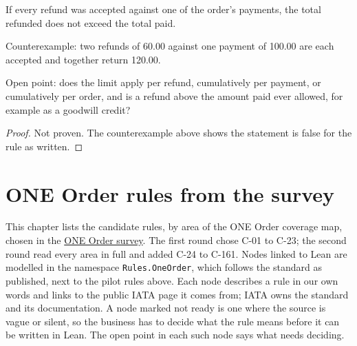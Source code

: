 \begin{theorem}
  \label{thm:refunds-le-payments}
  If every refund was accepted against one of the order's payments, the total
  refunded does not exceed the total paid.

  Counterexample: two refunds of 60.00 against one payment of 100.00 are each
  accepted and together return 120.00.

  Open point: does the limit apply per refund, cumulatively per payment, or
  cumulatively per order, and is a refund above the amount paid ever allowed,
  for example as a goodwill credit?
\end{theorem}
\begin{proof}
  Not proven.  The counterexample above shows the statement is false for the
  rule as written.
\end{proof}



\chapter{ONE Order rules from the survey}

This chapter lists the candidate rules, by area of the ONE Order coverage map, chosen in the
\href{https://github.com/samdengler/verified-air/blob/main/docs/one-order-survey.md}{ONE Order survey}.
The first round chose C-01 to C-23; the second round read every area in full and added C-24 to C-161.
Nodes linked to Lean are modelled in the namespace \texttt{Rules.OneOrder},
which follows the standard as published, next to the pilot rules above.
Each node describes a rule in our own words and
links to the public IATA page it comes from; IATA owns the standard and its
documentation.  A node marked not ready is one where the source is vague or
silent, so the business has to decide what the rule means before it can be
written in Lean.  The open point in each such node says what needs deciding.










